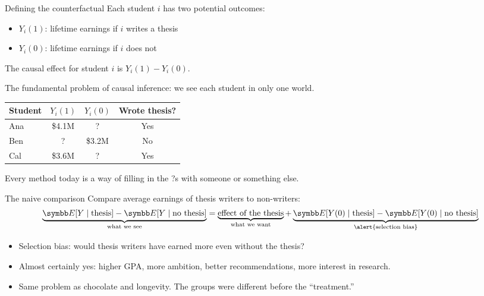 \documentclass[aspectratio=169,11pt]{beamer}
\begin{document}
\begin{frame}{Defining the counterfactual}
Each student $i$ has two \alert{potential outcomes}:
\begin{itemize}
	\item $Y_i(1)$: lifetime earnings if $i$ writes a thesis
	\item $Y_i(0)$: lifetime earnings if $i$ does not
\end{itemize}
The \alert{causal effect} for student $i$ is $Y_i(1) - Y_i(0)$.
\medskip

\alert{The fundamental problem of causal inference:} we see each student in only one world.
\begin{center}\small
\begin{tabular}{lccc}
\toprule
Student & $Y_i(1)$ & $Y_i(0)$ & Wrote thesis? \\
\midrule
Ana & \$4.1M & \alert{?} & Yes \\
Ben & \alert{?} & \$3.2M & No \\
Cal & \$3.6M & \alert{?} & Yes \\
\bottomrule
\end{tabular}
\end{center}
Every method today is a way of filling in the \alert{?}s with someone or something else.
\end{frame}


\begin{frame}{The naive comparison}
Compare average earnings of thesis writers to non-writers:
\begin{align*}
\underbrace{\E[Y \mid \text{thesis}] - \E[Y \mid \text{no thesis}]}_{\text{what we see}}
= \underbrace{\text{effect of the thesis}}_{\text{what we want}}
+ \underbrace{\E[Y(0) \mid \text{thesis}] - \E[Y(0) \mid \text{no thesis}]}_{\text{\alert{selection bias}}}
\end{align*}
\begin{itemize}
	\item Selection bias: would thesis writers have earned more \alert{even without the thesis}?
	\item Almost certainly yes: higher GPA, more ambition, better recommendations, more interest in research.
	\item Same problem as chocolate and longevity. The groups were different \alert{before} the ``treatment.''
\end{itemize}
\end{frame}
\end{document}
